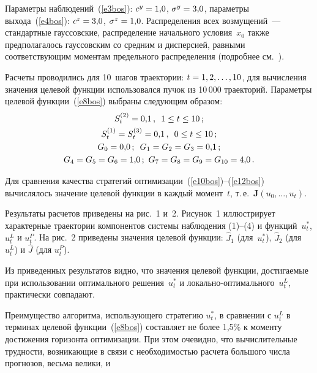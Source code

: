\begin{multicols}{2}
\medskip


  Параметры наблюдений~(\ref{e3bos}): $c^y\hm=1{,}0$, $\sigma^y\hm=3{,}0$, параметры 
выхода~(\ref{e4bos}): $c^z\hm=3{,}0$, $\sigma^z\hm=1{,}0$. Распределения всех 
возмущений~--- стандартные гауссовские, распределение начального условия~$x_0$ также 
предполагалось гауссовским со средним и дис\-пер\-си\-ей, равными соответствующим моментам 
предельного распределения (подробнее см.~\cite{1bos}).
  
  Расчеты проводились для 10~шагов траектории: $t\hm=1, 2,\ldots ,10$, для вычисления 
значения целевой функции использовался пучок из 10\,000 траекторий. Параметры целевой 
функции~(\ref{e8bos}) выбраны следующим образом:
  \begin{gather*}
  S_t^{(2)}=0{,}1\,,\enskip 1\leq t\leq 10\,;\\
  S_t^{(1)}=S_t^{(3)}=0{,}1\,,\enskip 0\leq t\leq 10\,;\\
  G_0=0{,}0\,;\enskip G_1=G_2=G_3=0{,}1\,;\\
  G_4=G_5=G_6=1{,}0\,;\  G_7=G_8=G_9=G_{10}=4{,}0\,.
  \end{gather*}

  Для сравнения качества стратегий оптимизации~(\ref{e10bos})--(\ref{e12bos}) 
  вычислялось значение целевой функции в каждый момент~$t$, т.\,е.\ 
$\mathbf{J}(u_0,\ldots ,u_t)$.
  
  Результаты расчетов приведены на рис.~1 и~2. Рисунок~1 иллюстрирует характерные 
траектории компонентов системы наблюдения (1)--(4) и функций~$u_t^*$, $u_t^L$ и $u_t^P$.  
На рис.~2 приведены значения целевой функции: $\hat{J}_1$ (для~$u_t^*$), $\hat{J}_2$ (для 
$u_t^L$) и $\hat{J}$ (для $u_t^P$).
  

Из приведенных результатов видно, что значения целевой функции, достигаемые при 
использовании оптимального решения~$u_t^*$ и локально-оп\-ти\-маль\-но\-го~$u_t^L$, 
практически совпадают. 

Преимущество алгоритма, использующего стратегию $u_t^*$, в 
сравнении с $u_t^L$ в терминах целевой функции~(\ref{e8bos}) составляет не более 1,5\% к 
моменту достижения горизонта оптимизации. При этом очевидно, что вы\-чис\-ли\-тель\-ные 
трудности, возникающие в связи с необходимостью расчета большого числа прогнозов, 
весьма велики, и\linebreak\vspace*{-12pt}

\pagebreak

\end{multicols}

